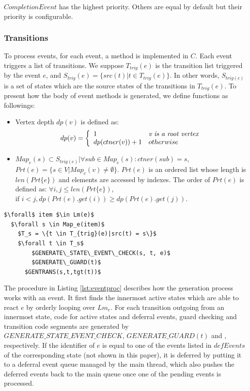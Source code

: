 $CompletionEvent$ has the highest priority. Others are equal by default but their priority is configurable.

\subsubsection{Transitions}

To process events, for each event, a method is implemented in $C$. Each event triggers a list of transitions. We suppose $T_{trig}(e)$ is the transition list triggered by the event $e$, and $S_{trig}(e) = \{src(t) | t \in T_{trig}(e)\}$. In other words, $S_{trig(e)}$ is a set of states which are the source states of the transitions in $T_{trig}(e)$. To present how the body of event methods is generated, we define functions as followings:
\begin{itemize}
	\item Vertex depth $dp(v)$ is defined as:
			\begin{equation}
			dp(v) =    \left\{
			\begin{array}{ll}
			1 & \textit{v is a root vertex}  \\
			dp(ctner(v)) + 1& otherwise \\
			\end{array} 
			\right.
			\end{equation}
	\item $Map_{e}(s) \subset S_{trig(e)} | \forall sub \in Map_e(s): ctner(sub) = s$, $Prt(e) = \{s \in V| Map_{e}(v) \neq \emptyset\}$. $Prt(e)$ is an ordered list whose length is $len(Prt\{e\})$ and elements are accessed by indexes. The order of $Prt(e)$ is defined as:	$\forall i, j \leq len(Prt\{e\})$, 
	\\ if $i < j, dp(Prt(e).get(i)) \geq dp(Prt(e).get(j))$. 	
\end{itemize}

\begin{lstlisting}[mathescape=true, caption=Generation process for an event, label=lst:eventproc, frame=single]
$\forall$ item $\in Lm(e)$
  $\forall s \in Map_e(item)$
    $T_s = \{t \in T_{trig}(e)|src(t) = s\}$
    $\forall t \in T_s$
	    $GENERATE\_STATE\_EVENT\_CHECK(s, t, e)$
	    $GENERATE\_GUARD(t)$
      $GENTRANS(s,t,tgt(t))$  	
\end{lstlisting}

The procedure in Listing \ref{lst:eventproc} describes how the generation process works with an event. 
It first finds the innermost active states which are able to react $e$ by orderly looping over $Lm_e$. 
For each transition outgoing from an innermost state, code for active states and deferral events, guard checking and transition code segments are generated by $GENERATE\_STATE\_EVENT\_CHECK$, $GENERATE\_GUARD(t)$ and , respectively. 
If the identifier of $e$ is equal to one of the events listed in $defEvents$ of the corresponding state (not shown in this paper), it is deferred by putting it to a deferral event queue managed by the main thread, which also pushes the deferred events back to the main queue once one of the pending events is processed. 

